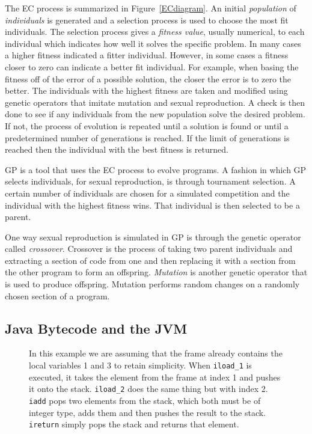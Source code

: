 \documentclass{sig-alternate}
\begin{document}
The EC process is summarized in Figure~\ref{ECdiagram}. An initial \textit{population} of \textit{individuals} is generated and a selection process is used to choose the most fit individuals. The selection process gives a \textit{fitness value}, usually numerical, to each individual which indicates how well it solves the specific problem. In many cases a higher fitness indicated a fitter individual. However, in some cases a fitness closer to zero can indicate a better fit individual. For example, when basing the fitness off of the error of a possible solution, the closer the error is to zero the better. The individuals with the highest fitness are taken and modified using genetic operators that imitate mutation and sexual reproduction. A check is then done to see if any individuals from the new population solve the desired problem. If not, the process of evolution is repeated until a solution is found or until a predetermined number of generations is reached. If the limit of generations is reached then the individual with the best fitness is returned.\par

	GP is a tool that uses the EC process to evolve programs. A fashion in which GP selects individuals, for sexual reproduction, is through tournament selection. A certain number of individuals are chosen for a simulated competition and the individual with the highest fitness wins. That individual is then selected to be a parent.\par 
		
	One way sexual reproduction is simulated in GP is through the genetic operator called \textit{crossover}. Crossover is the process of taking two parent individuals and extracting a section of code from one and then replacing it with a section from the other program to form an offspring. \textit{Mutation} is another genetic operator that is used to produce offspring. Mutation performs random changes on a randomly chosen section of a program.


\subsection{Java Bytecode and the JVM}

\begin{figure}
\centering
{}

\caption{In this example we are assuming that the frame already contains the local variables 1 and 3 to retain simplicity. When \texttt{iload\_1} is executed, it takes the element from the frame at index 1 and pushes it onto the stack. \texttt{iload\_2} does the same thing but with index 2. \texttt{iadd} pops two elements from the stack, which both must be of integer type, adds them and then pushes the result to the stack. \texttt{ireturn} simply pops the stack and returns that element.}
\label{stack}
\end{figure}
\end{document}
